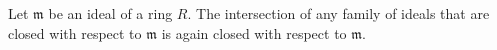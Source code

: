 Let $\mathfrak{m}$ be an ideal of a ring $R$. The intersection of any family of ideals that are closed with respect to $\mathfrak{m}$ is again closed with respect to $\mathfrak{m}$.
